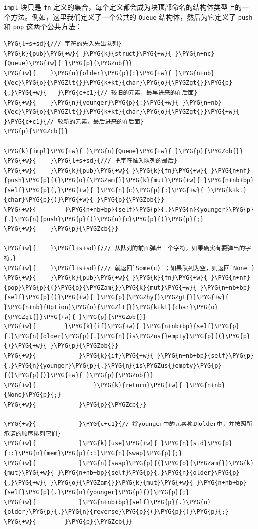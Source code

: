 \texttt{impl} 块只是 \texttt{fn} 定义的集合，每个定义都会成为块顶部命名的结构体类型上的一个方法。例如，这里我们定义了一个公共的 \texttt{Queue} 结构体，然后为它定义了 \texttt{push} 和 \texttt{pop} 这两个公共方法：

\begin{Verbatim}[commandchars=\\\{\},breaklines=true,breakanywhere=true,fontsize=\codefont,xleftmargin=17bp]
\PYG{l+s+sd}{/// 字符的先入先出队列}
\PYG{k}{pub}\PYG{+w}{ }\PYG{k}{struct}\PYG{+w}{ }\PYG{n+nc}{Queue}\PYG{+w}{ }\PYG{p}{\PYGZob{}}
\PYG{+w}{    }\PYG{n}{older}\PYG{p}{:}\PYG{+w}{ }\PYG{n+nb}{Vec}\PYG{o}{\PYGZlt{}}\PYG{k+kt}{char}\PYG{o}{\PYGZgt{}}\PYG{p}{,}\PYG{+w}{   }\PYG{c+c1}{// 较旧的元素，最早进来的在后面}
\PYG{+w}{    }\PYG{n}{younger}\PYG{p}{:}\PYG{+w}{ }\PYG{n+nb}{Vec}\PYG{o}{\PYGZlt{}}\PYG{k+kt}{char}\PYG{o}{\PYGZgt{}}\PYG{+w}{  }\PYG{c+c1}{// 较新的元素，最后进来的在后面}
\PYG{p}{\PYGZcb{}}

\PYG{k}{impl}\PYG{+w}{ }\PYG{n}{Queue}\PYG{+w}{ }\PYG{p}{\PYGZob{}}
\PYG{+w}{    }\PYG{l+s+sd}{/// 把字符推入队列的最后}
\PYG{+w}{    }\PYG{k}{pub}\PYG{+w}{ }\PYG{k}{fn}\PYG{+w}{ }\PYG{n+nf}{push}\PYG{p}{(}\PYG{o}{\PYGZam{}}\PYG{k}{mut}\PYG{+w}{ }\PYG{n+nb+bp}{self}\PYG{p}{,}\PYG{+w}{ }\PYG{n}{c}\PYG{p}{:}\PYG{+w}{ }\PYG{k+kt}{char}\PYG{p}{)}\PYG{+w}{ }\PYG{p}{\PYGZob{}}
\PYG{+w}{        }\PYG{n+nb+bp}{self}\PYG{p}{.}\PYG{n}{younger}\PYG{p}{.}\PYG{n}{push}\PYG{p}{(}\PYG{n}{c}\PYG{p}{)}\PYG{p}{;}
\PYG{+w}{    }\PYG{p}{\PYGZcb{}}

\PYG{+w}{    }\PYG{l+s+sd}{/// 从队列的前面弹出一个字符。如果确实有要弹出的字符，}
\PYG{+w}{    }\PYG{l+s+sd}{/// 就返回`Some(c)`；如果队列为空，则返回`None`}
\PYG{+w}{    }\PYG{k}{pub}\PYG{+w}{ }\PYG{k}{fn}\PYG{+w}{ }\PYG{n+nf}{pop}\PYG{p}{(}\PYG{o}{\PYGZam{}}\PYG{k}{mut}\PYG{+w}{ }\PYG{n+nb+bp}{self}\PYG{p}{)}\PYG{+w}{ }\PYG{p}{\PYGZhy{}\PYGZgt{}}\PYG{+w}{ }\PYG{n+nb}{Option}\PYG{o}{\PYGZlt{}}\PYG{k+kt}{char}\PYG{o}{\PYGZgt{}}\PYG{+w}{ }\PYG{p}{\PYGZob{}}
\PYG{+w}{        }\PYG{k}{if}\PYG{+w}{ }\PYG{n+nb+bp}{self}\PYG{p}{.}\PYG{n}{older}\PYG{p}{.}\PYG{n}{is\PYGZus{}empty}\PYG{p}{(}\PYG{p}{)}\PYG{+w}{ }\PYG{p}{\PYGZob{}}
\PYG{+w}{            }\PYG{k}{if}\PYG{+w}{ }\PYG{n+nb+bp}{self}\PYG{p}{.}\PYG{n}{younger}\PYG{p}{.}\PYG{n}{is\PYGZus{}empty}\PYG{p}{(}\PYG{p}{)}\PYG{+w}{ }\PYG{p}{\PYGZob{}}
\PYG{+w}{                }\PYG{k}{return}\PYG{+w}{ }\PYG{n+nb}{None}\PYG{p}{;}
\PYG{+w}{            }\PYG{p}{\PYGZcb{}}

\PYG{+w}{            }\PYG{c+c1}{// 将younger中的元素移到older中，并按照所承诺的顺序排列它们}
\PYG{+w}{            }\PYG{k}{use}\PYG{+w}{ }\PYG{n}{std}\PYG{p}{::}\PYG{n}{mem}\PYG{p}{::}\PYG{n}{swap}\PYG{p}{;}
\PYG{+w}{            }\PYG{n}{swap}\PYG{p}{(}\PYG{o}{\PYGZam{}}\PYG{k}{mut}\PYG{+w}{ }\PYG{n+nb+bp}{self}\PYG{p}{.}\PYG{n}{older}\PYG{p}{,}\PYG{+w}{ }\PYG{o}{\PYGZam{}}\PYG{k}{mut}\PYG{+w}{ }\PYG{n+nb+bp}{self}\PYG{p}{.}\PYG{n}{younger}\PYG{p}{)}\PYG{p}{;}
\PYG{+w}{            }\PYG{n+nb+bp}{self}\PYG{p}{.}\PYG{n}{older}\PYG{p}{.}\PYG{n}{reverse}\PYG{p}{(}\PYG{p}{)}\PYG{p}{;}
\PYG{+w}{        }\PYG{p}{\PYGZcb{}}


\end{Verbatim}

